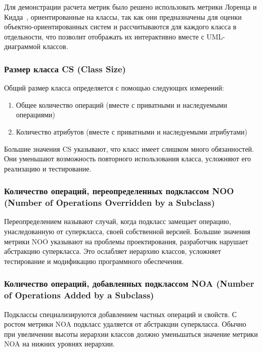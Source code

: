 Для демонстрации расчета метрик было решено использовать метрики Лоренца и
Кидда~\cite{orlov}, ориентированные на классы, так как они предназначены для
оценки объектно-ориентированных систем и рассчитываются для каждого класса в
отдельности, что позволит отображать их интерактивно вместе с UML-диаграммой
классов.

\subsubsection{Размер класса CS (Class Size)}

Общий размер класса определяется с помощью следующих измерений:

\begin{enumerate}
    \item Общее количество операций (вместе с приватными и наследуемыми
    операциями)
    \item Количество атрибутов (вместе с приватными и наследуемыми атрибутами)
\end{enumerate}

Большие значения CS указывают, что класс имеет слишком много обязанностей. Они
уменьшают возможность повторного использования класса, усложняют его реализацию
и тестирование.

\subsubsection{Количество операций, переопределенных подклассом NOO (Number of
Operations Overridden by a Subclass)}

Переопределением называют случай, когда подкласс замещает операцию,
унаследованную от суперкласса, своей собственной версией. Большие значения
метрики NOO указывают на проблемы проектирования, разработчик нарушает
абстракцию суперкласса. Это ослабляет иерархию классов, усложняет тестирование и
модификацию программного обеспечения.

\subsubsection{Количество операций, добавленных подклассом NOA (Number of
Operations Added by a Subclass)}

Подклассы специализируются добавлением частных операций и свойств. С ростом
метрики NOA подкласс удаляется от абстракции суперкласса. Обычно при увеличении
высоты иерархии классов должно уменьшаться значение метрики NOA на нижних
уровнях иерархии.

